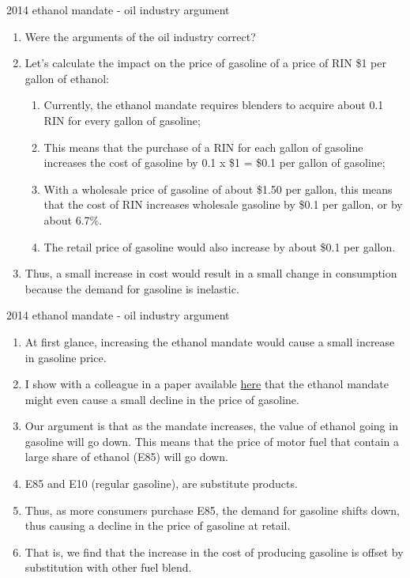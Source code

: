 \documentclass[table,xcolor=pdftex,dvipsnames]{beamer}\usepackage[]{graphicx}\usepackage[]{color}
\begin{document}

\begin{frame}{2014 ethanol mandate -  oil industry argument}
\begin{enumerate}[label=\textbullet]
    \item Were the arguments of the oil industry correct?
    \item Let's calculate the impact on the price of gasoline of a price of RIN \$1 per gallon of ethanol:
      \begin{enumerate}[label=-]
          \item Currently, the ethanol mandate requires blenders to acquire about 0.1 RIN for every gallon of gasoline;
          \item This means that the purchase of a RIN for each gallon of gasoline increases the cost of gasoline by 0.1 x \$1 = \$0.1 per gallon of gasoline;
          \item With a wholesale price of gasoline of about \$1.50 per gallon, this means that the cost of RIN increases wholesale gasoline by \$0.1 per gallon, or by about 6.7\%.
          \item The retail price of gasoline would also increase by about \$0.1 per gallon.
      \end{enumerate}
    \item Thus, a small increase in cost would result in a small change in consumption because the demand for gasoline is inelastic.
\end{enumerate}
\end{frame}


\begin{frame}{2014 ethanol mandate -  oil industry argument}
\begin{enumerate}[label=\textbullet]
    \item At first glance, increasing the ethanol mandate would cause a small increase in gasoline price.
    \item I show with a colleague in a paper available \href{http://www.card.iastate.edu/policy_briefs/display.aspx?id=1218}{here} that the ethanol mandate might even cause a small decline in the price of gasoline.
    \item Our argument is that as the mandate increases, the value of ethanol going in gasoline will go down. This means that the price of motor fuel that contain a large share of ethanol (E85) will go down.
    \item E85 and E10 (regular gasoline), are substitute products.
    \item Thus, as more consumers purchase E85, the demand for gasoline shifts down, thus causing a decline in the price of gasoline at retail.
    \item That is, we find that the increase in the cost of producing gasoline is offset by substitution with other fuel blend.
\end{enumerate}
\end{frame}
\end{document}
